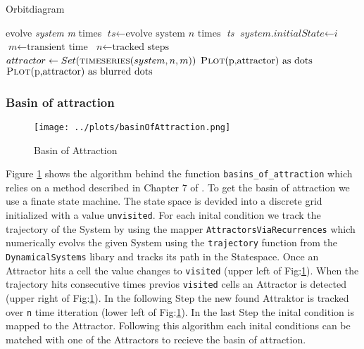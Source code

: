 \documentclass[a4paper,12pt, twoside]{article} %
\begin{document}
\begin{algorithm}[H]
  \caption{Orbitdiagram}\label{orbit}
  \begin{algorithmic}[1]
    \State evolve \textit{system} \textit{m} times
    \State $\textit{ts} \gets \text{evolve system } \textit{n} \text{ times}$
    \State \Return \textit{ts}
  \EndFunction
    \State $\textit{system.initialState} \gets \textit{i}$
  \EndFunction
    \State $\textit{m} \gets \text{transient time}$
    \State $\textit{n} \gets \text{tracked steps}$
      \Repeat
        \State {}
        \State $attractor \gets Set(\Call{timeseries}{system, n, m})$
          \State $\text{\Call{Plot}{p,attractor} as dots}$
        \Else 
          \State $\text{\Call{Plot}{p,attractor} as blurred dots}$
        \EndIf
    \EndFor
  \EndProcedure
  \end{algorithmic}
\end{algorithm}

\subsubsection{Basin of attraction}



\begin{figure}[H]
  \begin{centering}
    \texttt{[image: ../plots/basinOfAttraction.png]} 
    \caption{Basin of Attraction}\label{fig:basinAlgo}
  \end{centering}
\end{figure}

Figure \ref{fig:basinAlgo} shows the algorithm behind the function \texttt{basins_of_attraction} which relies on a method described in Chapter 7 of \autocite{nusse2012dynamics}.
To get the basin of attraction we use a finate state machine. The state space is devided into a discrete grid initialized with a value \texttt{unvisited}.
For each inital condition we track the trajectory of the System by using the mapper \texttt{AttractorsViaRecurrences} which numerically evolvs the given System using the \texttt{trajectory} function 
from the \texttt{DynamicalSystems} libary and tracks its path in the Statespace. Once an Attractor hits a cell the value 
changes to  \texttt{visited} (upper left of Fig:\ref*{fig:basinAlgo}). When the trajectory hits consecutive times previos \texttt{visited} cells an Attractor is detected (upper right of Fig:\ref*{fig:basinAlgo}).
In the following Step the new found Attraktor is tracked over \texttt{n} time itteration (lower left of Fig:\ref{fig:basinAlgo}). In the last Step the inital condition is mapped to the Attractor.
Following this algorithm each inital conditions can be matched with one of the Attractors to recieve the basin of attraction.
\end{document}

